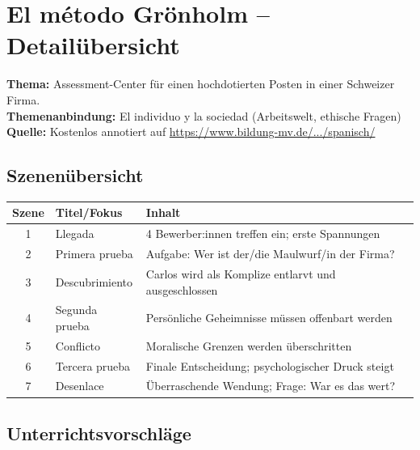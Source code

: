 \documentclass[11pt,a4paper]{article}
\begin{document}
\newpage
\section{El método Grönholm -- Detailübersicht}
\label{sec:gronholm}

\begin{infobox}
\textbf{Thema:} Assessment-Center für einen hochdotierten Posten in einer Schweizer Firma.\\
\textbf{Themenanbindung:} El individuo y la sociedad (Arbeitswelt, ethische Fragen)\\
\textbf{Quelle:} Kostenlos annotiert auf \url{https://www.bildung-mv.de/.../spanisch/}
\end{infobox}

\subsection{Szenenübersicht}

\begin{center}
\begin{tabularx}{\textwidth}{c|l|X}
\rowcolor{lightblue}
\textbf{Szene} & \textbf{Titel/Fokus} & \textbf{Inhalt} \\
\hline
1 & Llegada & 4 Bewerber:innen treffen ein; erste Spannungen \\
\rowcolor{lightgray}
2 & Primera prueba & Aufgabe: Wer ist der/die Maulwurf/in der Firma? \\
3 & Descubrimiento & Carlos wird als Komplize entlarvt und ausgeschlossen \\
\rowcolor{lightgray}
4 & Segunda prueba & Persönliche Geheimnisse müssen offenbart werden \\
5 & Conflicto & Moralische Grenzen werden überschritten \\
\rowcolor{lightgray}
6 & Tercera prueba & Finale Entscheidung; psychologischer Druck steigt \\
7 & Desenlace & Überraschende Wendung; Frage: War es das wert? \\
\hline
\end{tabularx}
\end{center}

\subsection{Unterrichtsvorschläge}
\end{document}
